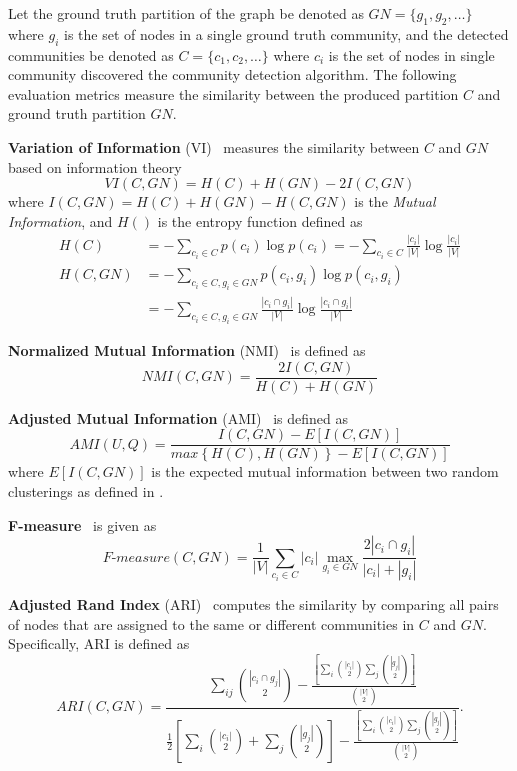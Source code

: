 Let the ground truth partition of the graph be denoted as $GN=\{g_1, g_2,\ldots\}$ where $g_i$ is the set of nodes in a single ground truth community, and the detected communities be denoted as $C=\{c_1, c_2,\ldots\}$ where $c_i$ is the set of nodes in single community discovered the community detection algorithm. The following evaluation metrics measure the similarity between the produced partition $C$ and ground truth partition $GN$.

\textbf{Variation of Information} (VI)~\cite{good2010performance} measures the similarity between $C$ and $GN$ based on information theory
\begin{equation}
VI(C, GN) = H(C) + H(GN) - 2I(C, GN)
\end{equation}
where $I(C,GN)=H(C) + H(GN) - H(C,GN)$ is the \textit{Mutual Information}, and $H()$ is the entropy function defined as
\begin{align}
H(C) &= -\sum_{c_i \in C} p(c_i) \log{p(c_i)} = -\sum_{c_i \in C} \frac{|c_i|}{|V|} \log{ \frac{|c_i|}{|V|} }\\
H(C,GN) &= -\sum_{c_i \in C, g_i \in {GN}} p(c_i,g_i) \log{p(c_i,g_i)} \nonumber\\
&= -\sum_{c_i \in C, g_i \in {GN}} \frac{|c_i \cap g_i|}{|V|} \log{ \frac{|c_i \cap g_i|}{|V|} }
\end{align}

\textbf{Normalized Mutual Information} (NMI)~\cite{wagner2007comparing} is defined as
\begin{equation} \label{eq:NMI}
NMI(C,GN)= \frac{2I(C,GN)}{H(C) + H(GN)}
\end{equation}

\textbf{Adjusted Mutual Information} (AMI)~\cite{vinh2010information} is defined as
\begin{equation}
AMI(U,Q)= \frac{I(C,GN) - E\left[I(C,GN)\right]}{max\left\{H(C), H(GN)\right\} - E\left[I(C,GN)\right]}
\end{equation}
where $E\left[I(C,GN)\right]$ is the expected mutual information between two random clusterings as defined in \cite{vinh2010information}.

\textbf{F-measure}~\cite{wagner2007comparing} is given as
\begin{equation}
\textit{F-measure}(C,GN) = \frac{1}{|V|}\sum_{c_i \in C} |c_i| \max_{g_i \in GN} \frac{2|c_i \cap g_i|}{|c_i|+|g_i|}
\end{equation}

\textbf{Adjusted Rand Index} (ARI)~\cite{hubert1985comparing} computes the similarity by comparing all pairs of nodes that are assigned to the same or different communities in $C$ and $GN$. Specifically, ARI is defined as
\begin{equation} \label{eq:ARI_definition}
ARI(C,GN) = \frac{  \sum_{ij}{\binom{|c_i \cap g_j|}{2}} - \frac{ [\sum_i {\binom{|c_i|}{2}} \sum_j{ \binom{|g_j|}{2} }   ] } { \binom{|V|}{2} } } {  \frac{1}{2} [\sum_i \binom{|c_i|}{2} + \sum_j \binom{|g_j|}{2} ]  - \frac{ [\sum_i {\binom{|c_i|}{2}} \sum_j{ \binom{|g_j|}{2} }   ] } { \binom{|V|}{2} } }.
\end{equation}

